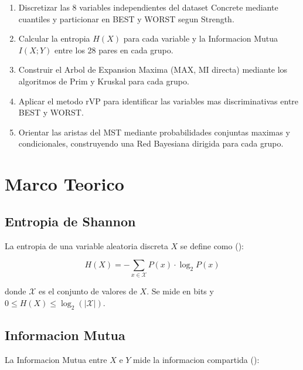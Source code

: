 \documentclass[12pt, a4paper]{article}
\begin{document}
\begin{enumerate}
    \item Discretizar las 8 variables independientes del dataset Concrete
          mediante cuantiles y particionar en BEST y WORST segun Strength.

    \item Calcular la entropia $H(X)$ para cada variable y la Informacion
          Mutua $I(X;Y)$ entre los 28 pares en cada grupo.

    \item Construir el Arbol de Expansion Maxima (MAX, MI directa) mediante
          los algoritmos de Prim y Kruskal para cada grupo.

    \item Aplicar el metodo rVP para identificar las variables mas
          discriminativas entre BEST y WORST.

    \item Orientar las aristas del MST mediante probabilidades conjuntas
          maximas y condicionales, construyendo una Red Bayesiana dirigida
          para cada grupo.
\end{enumerate}

\section{Marco Teorico}

\subsection{Entropia de Shannon}

La entropia de una variable aleatoria discreta $X$ se define como
(\cite{shannon1948}):

\begin{equation}\label{eq:entropy}
    \boxed{\; H(X) = -\sum_{x \in \mathcal{X}} P(x) \cdot \log_2 P(x) \;}
\end{equation}

donde $\mathcal{X}$ es el conjunto de valores de $X$. Se mide en bits y
$0 \le H(X) \le \log_2(|\mathcal{X}|)$.

\subsection{Informacion Mutua}

La Informacion Mutua entre $X$ e $Y$ mide la informacion compartida
(\cite{cover2006}):
\end{document}
